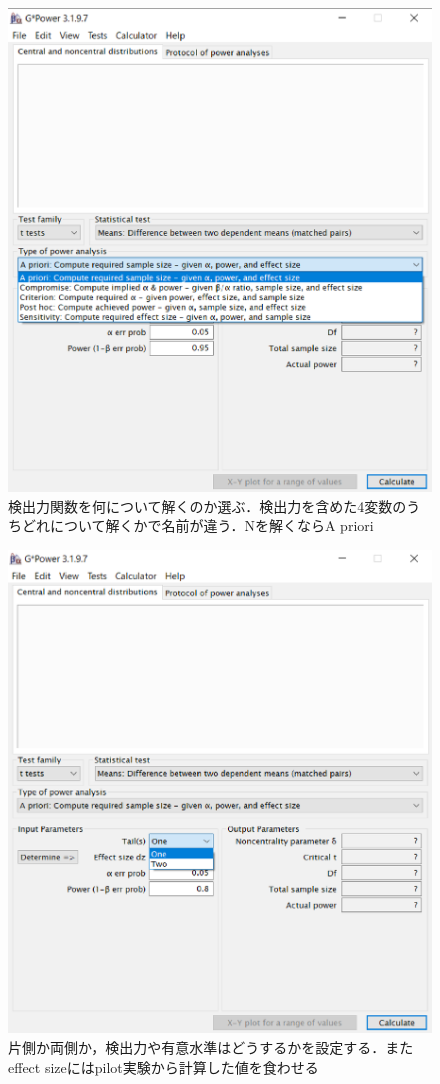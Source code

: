 \documentclass[11pt,a4paper]{ujreport} 	%
\begin{document}
\begin{figure}[H]
  \centering
  \includegraphics[width=12cm]{../figures/gpower2.eps}
  \caption{検出力関数を何について解くのか選ぶ．検出力を含めた4変数のうちどれについて解くかで名前が違う．Nを解くならA priori}
\end{figure}

\begin{figure}[H]
  \centering
  \includegraphics[width=12cm]{../figures/gpower3.eps}
  \caption{片側か両側か，検出力や有意水準はどうするかを設定する．またeffect sizeにはpilot実験から計算した値を食わせる}
\end{figure}
\end{document}
